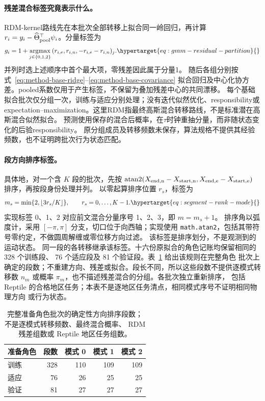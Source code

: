 \paragraph{残差混合标签究竟表示什么。}
\label{sec:residual-mixture-fit}\hypertarget{sec:residual-mixture-fit}{}
RDM-kernel路线先在本批次全部转移上拟合同一岭回归，再计算
\(r_i=y_i-\widehat\Theta_{\rm pool}^\top\psi_i\)。分量标签为
\begin{align}
 g_i=1+\underset{j\in\{0,1,2\}}{\operatorname{argmax}}\,
       (r_{i,e},r_{i,n},-r_{i,e}-r_{i,n})_j .
 \label{eq:gmm-residual-partition}\hypertarget{eq:gmm-residual-partition}{}
\end{align}
并列时选上述顺序中首个最大项，零残差因此属于分量1。
随后各组分别按式~\eqref{eq:method-base-ridge}--\eqref{eq:method-base-covariance}
拟合回归及中心化协方差。pooled系数仅用于产生标签，不保留为叠加残差中心的共同漂移。
每个基础拟合批次仅分组一次，训练与适应分别处理；没有迭代似然优化、responsibility或
expectation--maximization。这里RDM指最终高斯混合转移路线，不是标准潜在高斯混合似然拟合。
预测使用保存的混合后概率，在\(\tau\)时钟重抽分量，而非随状态变化的后验responsibility。
原分组成员及转移频数未保存，算法规格不提供其经验频数，也不证明跨批次行为状态匹配。

\paragraph{段方向排序标签。}
具体地，对一个含 \(K\) 段的批次，先按
\(\operatorname{atan2}(X_{\rm end,n}-X_{\rm start,n},
X_{\rm end,e}-X_{\rm start,e})\) 排序，再按段身份处理并列。
以零起算排序位置 \(r_s\)，标签为
\begin{equation}
m_s=\min\{2,\lfloor 3r_s/K\rfloor\},\qquad r_s=0,\ldots,K-1.
\label{eq:segment-rank-mode}\hypertarget{eq:segment-rank-mode}{}
\end{equation}
实现标签 0、1、2 对应前文混合分量序号 1、2、3，即 \(m=m_s+1\)。
排序角以弧度计，采用 \([-\pi,\pi]\) 分支，切口位于向西轴；实现使用
\texttt{math.atan2}，包括其带符号零约定，不做圆周解缠或零位移方向过滤。
该标签是排序划分，不是观测到的运动状态。
同一段的各转移继承该标签。十六份原拟合的角色记账均保留相同的 328 个训练段、
76 个适应段及 81 个验证段。表~\ref{tab:mode-rank-cardinality} 给出该规则在完整角色
批次上确定的段数；不重建方向、残差或拟合。段长不同，所以这些段数不提供逐模式转移数
\(n_m\) 或概率 \(\pi_m\)，也不描述残差混合的分组。各批次独立重新排序，
包括 Reptile 的合格地区任务；本表不是逐地区任务清点，相同模式序号不证明相同物理方向
或行为状态。

\begin{table}[htbp]
\centering\small
\caption{完整准备角色批次的确定性方向排序段数；不是逐模式转移频数、最终混合概率、
RDM 残差组数或 Reptile 地区任务组数。}
\label{tab:mode-rank-cardinality}\hypertarget{tab:mode-rank-cardinality}{}
\begin{tabular}{lrrrr}
\toprule
准备角色 & 段数 & 模式 0 & 模式 1 & 模式 2\\
\midrule
训练 & 328 & 110 & 109 & 109\\
适应 & 76 & 26 & 25 & 25\\
验证 & 81 & 27 & 27 & 27\\
\bottomrule
\end{tabular}
\end{table}

